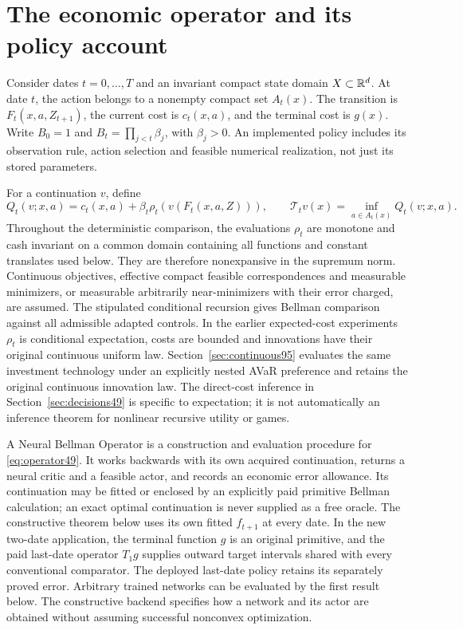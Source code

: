 \section{The economic operator and its policy account}\label{sec:core49}
Consider dates $t=0,\ldots,T$ and an invariant compact state domain $X\subset\mathbb R^d$. At date $t$, the action belongs to a nonempty compact set $A_t(x)$. The transition is $F_t(x,a,Z_{t+1})$, the current cost is $c_t(x,a)$, and the terminal cost is $g(x)$. Write $B_0=1$ and $B_t=\prod_{j<t}\beta_j$, with $\beta_j>0$. An implemented policy includes its observation rule, action selection and feasible numerical realization, not just its stored parameters.

For a continuation $v$, define
\begin{equation}\label{eq:operator49}
 Q_t(v;x,a)=c_t(x,a)+\beta_t\rho_t(v(F_t(x,a,Z))),\qquad
 \mathcal T_tv(x)=\inf_{a\in A_t(x)}Q_t(v;x,a).
\end{equation}
Throughout the deterministic comparison, the evaluations $\rho_t$ are monotone and cash invariant on a common domain containing all functions and constant translates used below. They are therefore nonexpansive in the supremum norm. Continuous objectives, effective compact feasible correspondences and measurable minimizers, or measurable arbitrarily near-minimizers with their error charged, are assumed. The stipulated conditional recursion gives Bellman comparison against all admissible adapted controls. In the earlier expected-cost experiments $\rho_t$ is conditional expectation, costs are bounded and innovations have their original continuous uniform law. Section~\ref{sec:continuous95} evaluates the same investment technology under an explicitly nested AVaR preference and retains the original continuous innovation law. The direct-cost inference in Section~\ref{sec:decisions49} is specific to expectation; it is not automatically an inference theorem for nonlinear recursive utility or games.

A Neural Bellman Operator is a construction and evaluation procedure for \eqref{eq:operator49}. It works backwards with its own acquired continuation, returns a neural critic and a feasible actor, and records an economic error allowance. Its continuation may be fitted or enclosed by an explicitly paid primitive Bellman calculation; an exact optimal continuation is never supplied as a free oracle. The constructive theorem below uses its own fitted $f_{t+1}$ at every date. In the new two-date application, the terminal function $g$ is an original primitive, and the paid last-date operator $T_1g$ supplies outward target intervals shared with every conventional comparator. The deployed last-date policy retains its separately proved error. Arbitrary trained networks can be evaluated by the first result below. The constructive backend specifies how a network and its actor are obtained without assuming successful nonconvex optimization.

